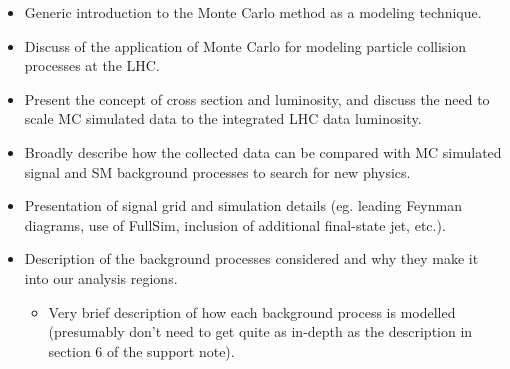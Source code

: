 \label{chapter:mc}

\begin{itemize}
\item Generic introduction to the Monte Carlo method as a modeling technique.
\item Discuss of the application of Monte Carlo for modeling particle collision processes at the LHC. 
\item Present the concept of cross section and luminosity, and discuss the need to scale MC simulated data to the integrated LHC data luminosity. 
\item Broadly describe how the collected data can be compared with MC simulated signal and SM background processes to search for new physics.
\item Presentation of signal grid and simulation details (eg. leading Feynman diagrams, use of FullSim, inclusion of additional final-state jet, etc.).
\item Description of the background processes considered and why they make it into our analysis regions.
\begin{itemize}
\item Very brief description of how each background process is modelled (presumably don't need to get quite as in-depth as the description in section 6 of the support note). 
\end{itemize}
\end{itemize}
